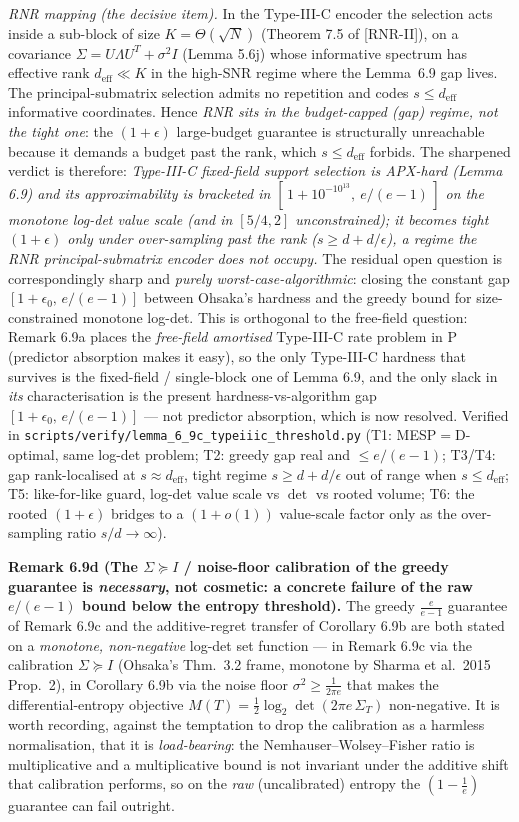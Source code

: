 \documentclass[
]{article}
\begin{document}
\emph{RNR mapping (the decisive item).} In the Type-III-C encoder the
selection acts inside a sub-block of size $K=\Theta(\sqrt N)$ (Theorem 7.5 of [RNR-II]),
on a covariance $\Sigma=U\Lambda U^T+\sigma^2 I$ (Lemma 5.6j) whose informative
spectrum has effective rank $d_{\mathrm{eff}}\ll K$ in the high-SNR regime
where the Lemma~6.9 gap lives. The principal-submatrix selection admits no
repetition and codes $s\le d_{\mathrm{eff}}$ informative coordinates. Hence
\emph{RNR sits in the budget-capped (gap) regime, not the tight one}: the
$(1+\epsilon)$ large-budget guarantee is structurally unreachable because it
demands a budget past the rank, which $s\le d_{\mathrm{eff}}$ forbids. The
sharpened verdict is therefore: \emph{Type-III-C fixed-field support selection
is APX-hard (Lemma 6.9) and its approximability is bracketed in
$[\,1+10^{-10^{13}},\ e/(e-1)\,]$ on the monotone log-det value scale (and in
$[5/4,2]$ unconstrained); it becomes tight $(1+\epsilon)$ only under
over-sampling past the rank ($s\ge d+d/\epsilon$), a regime the RNR
principal-submatrix encoder does not occupy.} The residual open question is
correspondingly sharp and \emph{purely worst-case-algorithmic}: closing the
constant gap $[1+\epsilon_0,\,e/(e-1)]$ between Ohsaka's hardness and the greedy
bound for size-constrained monotone log-det. This is orthogonal to the
free-field question: Remark 6.9a places the \emph{free-field amortised}
Type-III-C rate problem in $\mathrm P$ (predictor absorption makes it easy),
so the only Type-III-C hardness that survives is the fixed-field /
single-block one of Lemma 6.9, and the only slack in \emph{its}
characterisation is the present hardness-vs-algorithm gap $[1+\epsilon_0,
\,e/(e-1)]$ --- not predictor absorption, which is now resolved. Verified
in \texttt{scripts/verify/lemma\_6\_9c\_typeiiic\_threshold.py} (T1:
MESP$=$D-optimal, same log-det problem; T2: greedy gap real and $\le e/(e-1)$;
T3/T4: gap rank-localised at $s\approx d_{\mathrm{eff}}$, tight regime
$s\ge d+d/\epsilon$ out of range when $s\le d_{\mathrm{eff}}$; T5:
like-for-like guard, log-det value scale vs $\det$ vs rooted volume; T6: the
rooted $(1+\epsilon)$ bridges to a $(1+o(1))$ value-scale factor only as the
over-sampling ratio $s/d\to\infty$).

\textbf{Remark 6.9d (The $\Sigma\succeq I$ / noise-floor calibration of the
greedy guarantee is \emph{necessary}, not cosmetic: a concrete failure of the
raw $e/(e-1)$ bound below the entropy threshold).} The greedy
$\tfrac{e}{e-1}$ guarantee of Remark 6.9c and the additive-regret transfer of
Corollary 6.9b are both stated on a \emph{monotone, non-negative} log-det set
function --- in Remark 6.9c via the calibration $\Sigma\succeq I$ (Ohsaka's
Thm.\ 3.2 frame, monotone by Sharma et al.\ 2015 Prop.\ 2), in Corollary 6.9b
via the noise floor $\sigma^2\ge\tfrac1{2\pi e}$ that makes the
differential-entropy objective $M(T)=\tfrac12\log_2\det(2\pi e\,\Sigma_T)$
non-negative. It is worth recording, against the temptation to drop the
calibration as a harmless normalisation, that it is \emph{load-bearing}: the
Nemhauser--Wolsey--Fisher ratio is multiplicative and a multiplicative bound is
not invariant under the additive shift that calibration performs, so on the
\emph{raw} (uncalibrated) entropy the $(1-\tfrac1e)$ guarantee can fail
outright.
\end{document}
